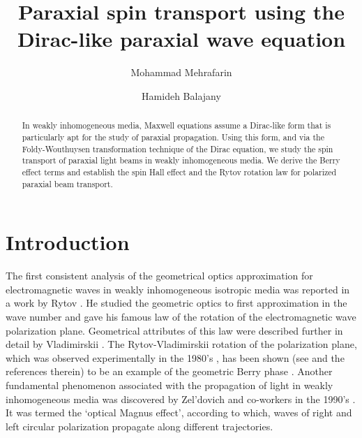 \documentclass[aps,pra,preprint,superscriptaddress,showpacs,showkeys]{revtex4}
\begin{document}
\title{Paraxial spin transport using the Dirac-like paraxial wave equation}

\author{Mohammad Mehrafarin}
\author{Hamideh Balajany}

\begin{abstract}
In weakly inhomogeneous media, Maxwell equations assume a Dirac-like form that is particularly apt for the study of paraxial propagation. Using this form, and via the Foldy-Wouthuysen transformation technique of the Dirac equation, we study the spin transport of paraxial light beams in weakly inhomogeneous media. We derive the Berry effect terms and establish the spin Hall effect and the Rytov rotation law for polarized paraxial beam transport.
\end{abstract}

\maketitle

\section{Introduction}

The first consistent analysis of the geometrical optics approximation for electromagnetic waves in weakly inhomogeneous isotropic media was reported in a work by Rytov \cite{Rytov}. He studied the geometric optics to first approximation in the wave number and gave his
famous law of the rotation of the electromagnetic wave polarization plane. Geometrical attributes of this law were described further in detail by Vladimirskii \cite{Vladimirskii}. The Rytov-Vladimirskii rotation of the polarization plane, which was observed experimentally in the 1980's \cite{Tomito}, has been shown (see \cite{Shapere} and the references therein) to be an example of the geometric Berry phase \cite{Berry}. Another fundamental phenomenon associated with the propagation of light in weakly inhomogeneous media was discovered by Zel'dovich and co-workers in the 1990's \cite{Zeldovich,Zeldovich2}. It was termed the `optical Magnus effect', according to which, waves of right and left circular polarization propagate along different trajectories. 
\end{document}
